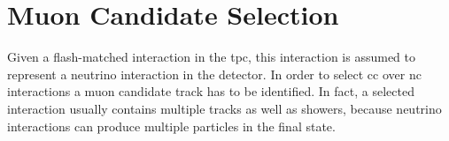 





\section{Muon Candidate Selection}
\label{sec:selection_muon_candidate}

Given a flash-matched interaction in the \acrshort{tpc}, this interaction is assumed to represent a neutrino interaction in the detector. 
In order to select \acrshort{cc} over \acrshort{nc} interactions a muon candidate track has to be identified. In fact, a selected interaction usually contains multiple tracks as well as showers, because neutrino interactions can produce multiple particles in the final state. 


